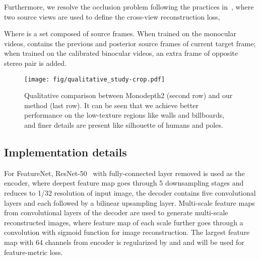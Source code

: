 \documentclass[runningheads]{llncs}
\begin{document}
Furthermore, we resolve the occlusion problem following the practices in~\cite{monodepth2,ddvo,noise,dfr}, where two source views are used to define the cross-view reconstruction loss,

Where  is a set composed of source frames.
When trained on the monocular videos,  contains the previous and posterior source frames of current target frame; when trained on the calibrated binocular videos, an extra frame of opposite stereo pair is added.

\iffalse
We combine proposed feature-metric loss  by photometric loss  for ultimate cross-view reconstruction loss.

Where the \textit{min} operation is used to avoid the interference of occlusions, as suggested by \cite{monodepth2}, only the minimal loss among all the source frames can go through back-propagation.
And hyperparameter  is set to  by cross validation.
The specific form of the feature-metric loss, photometric loss and depth smoothness losses are:


\fi





\begin{figure*}[!tp]
\centering
\texttt{[image: fig/qualitative\_study-crop.pdf]}
\caption{
Qualitative comparison between Monodepth2 \cite{monodepth2} (second row) and our method (last row).
It can be seen that we achieve better performance on the low-texture regions like walls and billboards, and finer details are present like silhouette of humans and poles.
}
\label{qualitative}
\end{figure*}

\subsection{Implementation details}\label{sec45}
For FeatureNet, ResNet-50~\cite{resnet} with fully-connected layer removed is used as the encoder, where deepest feature map goes through 5 downsampling stages and reduces to 1/32 resolution of input image, the decoder contains five  convolutional layers and each followed by a bilinear upsampling layer. Multi-scale feature maps from convolutional layers of the decoder are used to generate multi-scale reconstructed images, where feature map of each scale further goes through a  convolution with sigmoid function for image reconstruction. The largest feature map with 64 channels from encoder is regularized by  and  and will be used for feature-metric loss.
\end{document}
